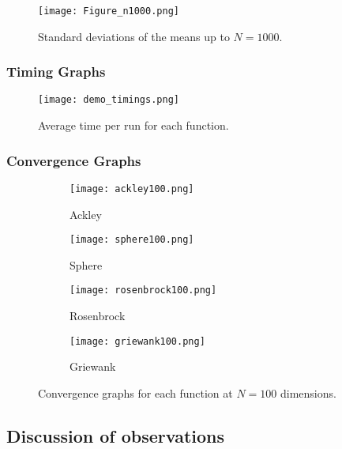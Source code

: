 \documentclass[KomodoMain.tex]{subfiles}
\begin{document}
\begin{figure}[!htbp]
\caption{Standard deviations of the means up to $N = 1000$.}
\centering
\texttt{[image: Figure\_n1000.png]}
\end{figure}

\newpage

\subsubsection{Timing Graphs}

\begin{figure}[!htbp]
\caption{Average time per run for each function.}
\centering
\texttt{[image: demo\_timings.png]}
\end{figure}

\newpage
\subsubsection{Convergence Graphs}

\begin{figure}[!htbp]
     \centering
     \begin{subfigure}[b]{0.4\textwidth}
         \centering
         \texttt{[image: ackley100.png]}
         \caption{Ackley}
         \label{fig:ackley}
     \end{subfigure}
     \hfill
     \begin{subfigure}[b]{0.4\textwidth}
         \centering
         \texttt{[image: sphere100.png]}
         \caption{Sphere}
         \label{fig:sphere}
     \end{subfigure}
     \hfill
     \begin{subfigure}[b]{0.4\textwidth}
         \centering
         \texttt{[image: rosenbrock100.png]}
         \caption{Rosenbrock}
         \label{fig:rosenbrock}
     \end{subfigure}
     \hfill
     \begin{subfigure}[b]{0.4\textwidth}
         \centering
         \texttt{[image: griewank100.png]}
         \caption{Griewank}
         \label{fig:griewank}
     \end{subfigure}
        \caption{Convergence graphs for each function at $N = 100$ dimensions.}
        \label{fig:four graphs}
\end{figure}


\newpage
\subsection{Discussion of observations}  
\end{document}
